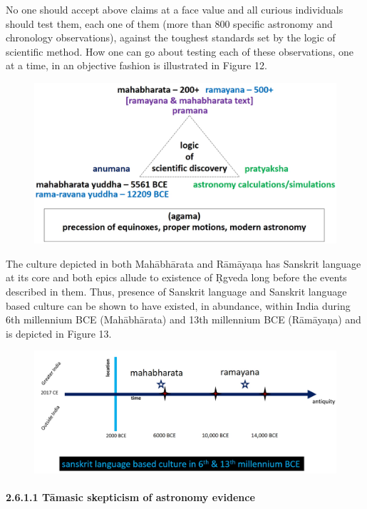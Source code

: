 No one should accept above claims at a face value and all curious individuals should test them, each one of them (more than 800 specific astronomy and chronology observations), against the toughest standards set by the logic of scientific method. How one can go about testing each of these observations, one at a time, in an objective fashion is illustrated in Figure 12.

\begin{figure}[!htbp]
\includegraphics[scale=0.18]{"images/8-12.jpg"}
\caption{}\label{art8-fig12}
\end{figure}

The culture depicted in both Mahābhārata and Rāmāyaņa has Sanskrit language at its core and both epics allude to existence of Ṛgveda long before the events described in them. Thus, presence of Sanskrit language and Sanskrit language based culture can be shown to have existed, in abundance, within India during 6th millennium BCE (Mahābhārata) and 13th millennium BCE (Rāmāyaņa) and is depicted in Figure 13.

\begin{figure}[!htbp]
\includegraphics[scale=0.19]{"images/8-13.jpg"}
\caption{}\label{art8-fig13}
\end{figure}


\paragraph*{2.6.1.1 Tāmasic skepticism of astronomy evidence}

